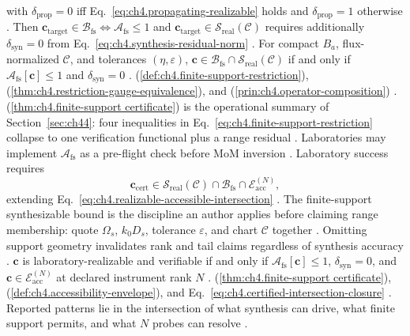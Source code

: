 with \(\delta_{\mathrm{prop}}=0\) iff Eq.~\eqref{eq:ch4.propagating-realizable} holds and
\(\delta_{\mathrm{prop}}=1\) otherwise \cite{harrington2001}. Then
\(\mathbf{c}_{\mathrm{target}}\in\mathcal{B}_{\mathrm{fs}}\iff\mathcal{A}_{\mathrm{fs}}\le1\) and
\(\mathbf{c}_{\mathrm{target}}\in\mathcal{S}_{\mathrm{real}}(\mathcal{C})\) requires additionally
\(\delta_{\mathrm{syn}}=0\) from Eq.~\eqref{eq:ch4.synthesis-residual-norm} \cite{stratton1941}.
\label{thm:ch4.finite-support certificate}
For compact \(B_{a}\), flux-normalized \(\mathcal{C}\), and tolerances \((\eta,\varepsilon)\),
\(\mathbf{c}\in\mathcal{B}_{\mathrm{fs}}\cap\mathcal{S}_{\mathrm{real}}(\mathcal{C})\) if and only if
\(\mathcal{A}_{\mathrm{fs}}[\mathbf{c}]\le1\) and \(\delta_{\mathrm{syn}}=0\) \cite{hansen1988}.
(\ref{def:ch4.finite-support-restriction}), (\ref{thm:ch4.restriction-gauge-equivalence}), and
(\ref{prin:ch4.operator-composition}) \cite{hansen1988}.
(\ref{thm:ch4.finite-support certificate}) is the operational summary of Section~\ref{sec:ch44}: four inequalities in
Eq.~\eqref{eq:ch4.finite-support-restriction} collapse to one verification functional plus a range residual
\cite{devaney2004}. Laboratories may implement \(\mathcal{A}_{\mathrm{fs}}\) as a pre-flight check before MoM inversion
\cite{harrington2001}.
Laboratory success requires
\begin{equation}
\label{eq:ch4.certified-intersection-closure}
\mathbf{c}_{\mathrm{cert}}
\in
\mathcal{S}_{\mathrm{real}}(\mathcal{C})
\cap
\mathcal{B}_{\mathrm{fs}}
\cap
\mathcal{E}_{\mathrm{acc}}^{(N)},
\end{equation}
extending Eq.~\eqref{eq:ch4.realizable-accessible-intersection} \cite{harrington2001}. 
The finite-support synthesizable bound is the discipline an author applies before claiming range membership: quote $\Omega_s$, $k_0 D_s$, tolerance $\varepsilon$, and chart $\mathcal{C}$ together \cite{stratton1941}. Omitting support geometry invalidates rank and tail claims regardless of synthesis accuracy \cite{hansen1988}.
\label{thm:ch4.three-way-certificate}
\(\mathbf{c}\) is laboratory-realizable and verifiable if and only if
\(\mathcal{A}_{\mathrm{fs}}[\mathbf{c}]\le1\), \(\delta_{\mathrm{syn}}=0\), and
\(\mathbf{c}\in\mathcal{E}_{\mathrm{acc}}^{(N)}\) at declared instrument rank \(N\) \cite{hansen1988}.
(\ref{thm:ch4.finite-support certificate}), (\ref{def:ch4.accessibility-envelope}), and
Eq.~\eqref{eq:ch4.certified-intersection-closure} \cite{hansen1988}.
Reported patterns lie in the intersection of what synthesis can drive, what finite support permits, and what $N$ probes can resolve \cite{stratton1941}.
